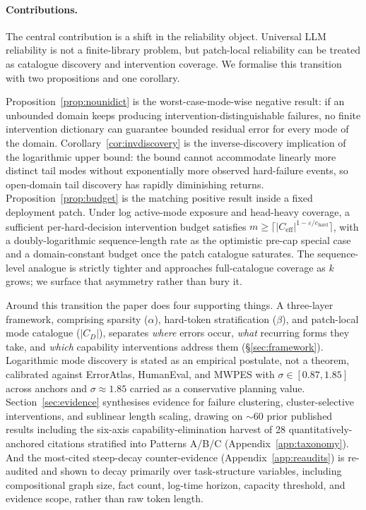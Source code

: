 \documentclass{article}
\theoremstyle{taeplain}
\theoremstyle{taedefn}
\begin{document}
\paragraph{Contributions.}
The central contribution is a shift in the reliability object. Universal LLM reliability is not a finite-library problem, but patch-local reliability can be treated as catalogue discovery and intervention coverage. We formalise this transition with two propositions and one corollary.

Proposition~\ref{prop:nounidict} is the worst-case-mode-wise negative result: if an unbounded domain keeps producing intervention-distinguishable failures, no finite intervention dictionary can guarantee bounded residual error for every mode of the domain. Corollary~\ref{cor:invdiscovery} is the inverse-discovery implication of the logarithmic upper bound: the bound cannot accommodate linearly more distinct tail modes without exponentially more observed hard-failure events, so open-domain tail discovery has rapidly diminishing returns. Proposition~\ref{prop:budget} is the matching positive result inside a fixed deployment patch. Under log active-mode exposure and head-heavy coverage, a sufficient per-hard-decision intervention budget satisfies $m \geq \lceil |C_{\text{eff}}|^{1 - \varepsilon / e_{\text{hard}}} \rceil$, with a doubly-logarithmic sequence-length rate as the optimistic pre-cap special case and a domain-constant budget once the patch catalogue saturates. The sequence-level analogue is strictly tighter and approaches full-catalogue coverage as $k$ grows; we surface that asymmetry rather than bury it.

Around this transition the paper does four supporting things. A three-layer framework, comprising sparsity ($\alpha$), hard-token stratification ($\beta$), and patch-local mode catalogue ($|C_D|$), separates \emph{where} errors occur, \emph{what} recurring forms they take, and \emph{which} capability interventions address them (\S\ref{sec:framework}). Logarithmic mode discovery is stated as an empirical postulate, not a theorem, calibrated against ErrorAtlas, HumanEval, and MWPES with $\sigma \in [0.87, 1.85]$ across anchors and $\sigma \approx 1.85$ carried as a conservative planning value. Section~\ref{sec:evidence} synthesises evidence for failure clustering, cluster-selective interventions, and sublinear length scaling, drawing on $\sim$60 prior published results including the six-axis capability-elimination harvest of 28 quantitatively-anchored citations stratified into Patterns A/B/C (Appendix~\ref{app:taxonomy}). And the most-cited steep-decay counter-evidence (Appendix~\ref{app:reaudits}) is re-audited and shown to decay primarily over task-structure variables, including compositional graph size, fact count, log-time horizon, capacity threshold, and evidence scope, rather than raw token length.
\end{document}
